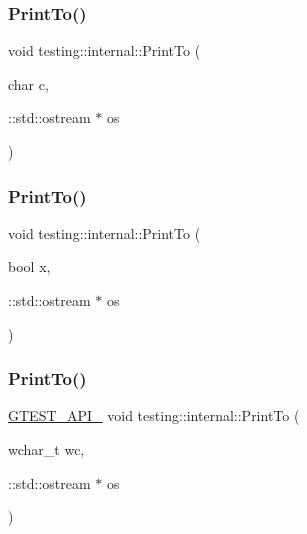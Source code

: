 \mbox{\label{namespacetesting_1_1internal_a476bd3d411d4f129620aaf8999c257c0}} 
\subsubsection{\texorpdfstring{PrintTo()}{PrintTo()}\hspace{0.1cm}{\footnotesize\ttfamily [7/23]}}
{\footnotesize\ttfamily void testing\+::internal\+::\+Print\+To (\begin{DoxyParamCaption}\item[{char}]{c,  }\item[{\+::std\+::ostream $\ast$}]{os }\end{DoxyParamCaption})\hspace{0.3cm}{\ttfamily [inline]}}

\mbox{\label{namespacetesting_1_1internal_a2979ac1ad3e05c51dcd7dca2eb34e6ce}} 
\subsubsection{\texorpdfstring{PrintTo()}{PrintTo()}\hspace{0.1cm}{\footnotesize\ttfamily [8/23]}}
{\footnotesize\ttfamily void testing\+::internal\+::\+Print\+To (\begin{DoxyParamCaption}\item[{bool}]{x,  }\item[{\+::std\+::ostream $\ast$}]{os }\end{DoxyParamCaption})\hspace{0.3cm}{\ttfamily [inline]}}

\mbox{\label{namespacetesting_1_1internal_a6c50fd437a2ae2ff6f182ccd6c2744dd}} 
\subsubsection{\texorpdfstring{PrintTo()}{PrintTo()}\hspace{0.1cm}{\footnotesize\ttfamily [9/23]}}
{\footnotesize\ttfamily \mbox{\hyperlink{_obj__test_2lib_2googletest-release-1_88_81_2googletest_2include_2gtest_2internal_2gtest-port_8h_aa73be6f0ba4a7456180a94904ce17790}{G\+T\+E\+S\+T\+\_\+\+A\+P\+I\+\_\+}} void testing\+::internal\+::\+Print\+To (\begin{DoxyParamCaption}\item[{wchar\+\_\+t}]{wc,  }\item[{\+::std\+::ostream $\ast$}]{os }\end{DoxyParamCaption})}

